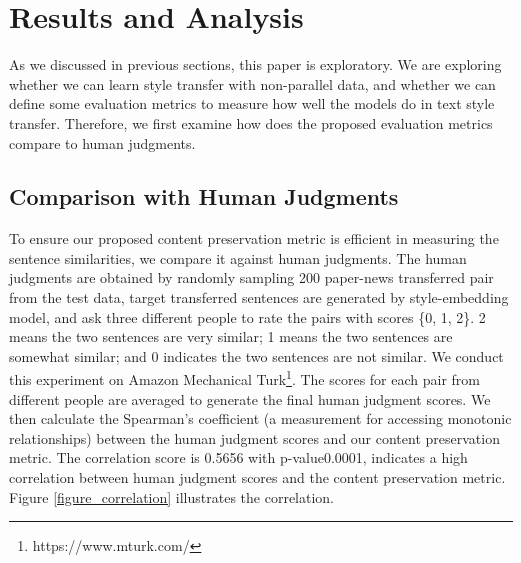\documentclass[letterpaper]{article} \usepackage{aaai18}  \usepackage{times}  \usepackage{helvet}  \usepackage{courier}  \usepackage{url}  \usepackage{graphicx}  \usepackage{amsmath}
\begin{document}
\section{Results and Analysis}

As we discussed in previous sections, this paper is exploratory. We are exploring whether we can learn style transfer with 
non-parallel data, and whether we can define some evaluation metrics to measure how well the models do in text style transfer.
Therefore, we first examine how does the proposed evaluation metrics compare to human judgments.

\subsection{Comparison with Human Judgments} 
To ensure our proposed content preservation metric is efficient in measuring the sentence similarities, we compare it against human judgments. 
The human judgments are obtained by randomly sampling 200 paper-news transferred pair from the test data,
target transferred sentences are generated by style-embedding model, 
and ask three different people to rate the pairs with scores \{0, 1, 2\}. 
2 means the two sentences are very similar; 1 means the two sentences 
are somewhat similar; and 0 indicates the two sentences are not similar. 
We conduct this experiment on Amazon Mechanical Turk\footnote{https://www.mturk.com/}. 
The scores for each pair from different people are averaged to generate the final human judgment scores. 
We then calculate the Spearman's coefficient (a measurement for accessing monotonic relationships) between the human judgment scores 
and our content preservation metric. 
The correlation score is 0.5656 with p-value0.0001, indicates a high correlation between human judgment scores and the 
content preservation metric.  
Figure \ref{figure_correlation} illustrates the correlation.
\end{document}
